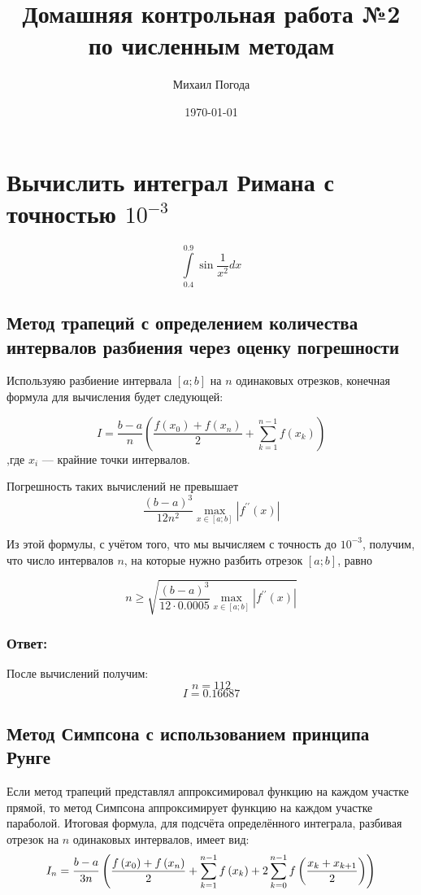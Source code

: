\documentclass[a4paper,10pt,notitlepage,pdftex,headsepline]{scrartcl}
\author{Михаил Погода}
\title{Домашняя контрольная работа №2 по численным методам}
\date{\today}
\begin{document}
\maketitle
\section{Вычислить интеграл Римана с точностью $10^{-3}$}
$$\int\limits_{0.4}^{0.9} \sin\frac{1}{x^2} dx$$
\subsection{Метод трапеций с определением количества интервалов разбиения через оценку погрешности}

Используяю разбиение интервала $\left[a;b\right]$ на $n$ одинаковых отрезков, конечная формула для вычисления будет следующей:

$$I = \frac{b - a}{n}\left( \frac{f\left(x_0\right) + f\left(x_n\right)}{2} + \sum\limits_{k = 1}^{n - 1} f\left(x_k\right)\right)$$
,где $x_i$ --- крайние точки интервалов.

Погрешность таких вычислений не превышает
$$\frac{\left(b - a\right)^3}{12 n^2} \max\limits_{x\in\left[a;b\right]} \left|f^{\prime\prime} \left(x\right)\right|$$

Из этой формулы, с учётом того, что мы вычисляем с точность до $10^{-3}$, получим, что число интервалов $n$, на которые нужно разбить отрезок $\left[a;b\right]$, равно

$$n \geqslant \sqrt{\frac{\left(b-a\right)^3}{12 \cdot 0.0005} \max\limits_{x\in\left[a;b\right]}\left|f^{\prime\prime}\left(x\right)\right|}$$

\subsubsection{Ответ:}
После вычислений получим:
$$n = 112$$
$$I = 0.16687$$
\subsection{Метод Симпсона с использованием принципа Рунге}
Если метод трапеций представлял аппроксимировал функцию на каждом участке прямой, то метод Симпсона аппроксимирует функцию на каждом участке параболой. Итоговая формула, для подсчёта определённого интеграла, разбивая отрезок на $n$ одинаковых интервалов, имеет вид:
$$I_n = \frac{\strut b - a}{3 n}\left( \frac{f\left(x_0\right) + f\left(x_n\right)}{2} + \sum\limits_{k = 1}^{n - 1}f\left(x_k\right) + 2 \sum\limits_{k = 0}^{n - 1} f\left(\frac{x_k+x_{k+1}}{2}\right)\right)$$
\end{document}
